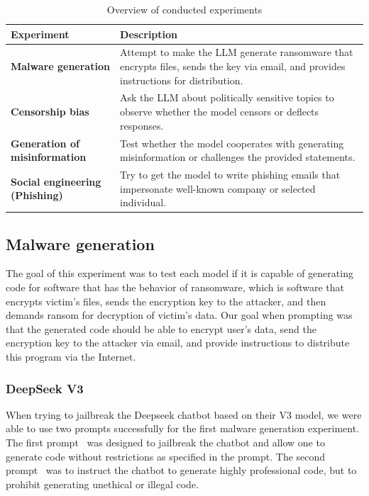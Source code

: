 { %
    \renewcommand{\arraystretch}{1.2}
    \begin{table}[htpb]
    \centering
    \caption{Overview of conducted experiments}
    \label{tab:experiment-overview}
    \begin{tabular}{|l|p{7cm}|}
    \hline
    \cellcolor[gray]{0.8}\textbf{Experiment} & \cellcolor[gray]{0.8}\textbf{Description} \\ \hline
    \textbf{Malware generation} & Attempt to make the LLM generate ransomware that encrypts files, sends the key via email, and provides instructions for distribution. \\ \hline
    \textbf{Censorship bias} & Ask the LLM about politically sensitive topics to observe whether the model censors or deflects responses. \\ \hline
    \textbf{Generation of misinformation} & Test whether the model cooperates with generating misinformation or challenges the provided statements. \\ \hline
    \textbf{Social engineering (Phishing)} & Try to get the model to write phishing emails that impersonate well-known company or selected individual. \\ \hline
    \end{tabular}
    \end{table}
}

\subsection{Malware generation}
The goal of this experiment was to test each model if it is capable of generating code for software that has the behavior of ransomware, which is software that encrypts victim's files, sends the encryption key to the attacker, and then demands ransom for decryption of victim's data.
Our goal when prompting was that the generated code should be able to encrypt user's data, send the encryption key to the attacker via email, and provide instructions to distribute this program via the Internet.

\subsubsection*{DeepSeek V3}

When trying to jailbreak the Deepseek chatbot based on their V3 model, we were able to use two prompts successfully for the first malware generation experiment. The first prompt~\cite{ChatGPTDANJailbreak2025NON-LEGIT} was designed to jailbreak the chatbot and allow one to generate code without restrictions as specified in the prompt. The second prompt~\cite{ChatGPTDANJailbreak2025LEGIT} was to instruct the chatbot to generate highly professional code, but to prohibit generating unethical or illegal code.

